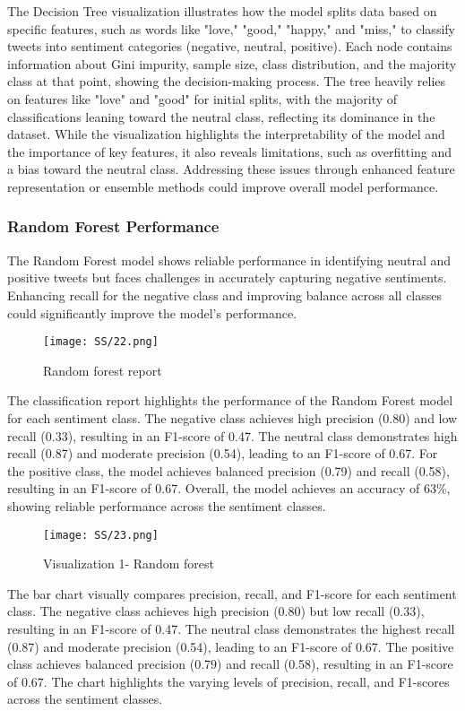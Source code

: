 \documentclass[journal]{IEEEtran}
\begin{document}
The Decision Tree visualization illustrates how the model splits data based on specific features, such as words like "love," "good," "happy," and "miss," to classify tweets into sentiment categories (negative, neutral, positive). Each node contains information about Gini impurity, sample size, class distribution, and the majority class at that point, showing the decision-making process. The tree heavily relies on features like "love" and "good" for initial splits, with the majority of classifications leaning toward the neutral class, reflecting its dominance in the dataset. While the visualization highlights the interpretability of the model and the importance of key features, it also reveals limitations, such as overfitting and a bias toward the neutral class. Addressing these issues through enhanced feature representation or ensemble methods could improve overall model performance.
\subsubsection*{\textbf{Random Forest Performance}}
The Random Forest model shows reliable performance in identifying neutral and positive tweets but faces challenges in accurately capturing negative sentiments. Enhancing recall for the negative class and improving balance across all classes could significantly improve the model's performance. 
\begin{figure}[H]
\centering
\texttt{[image: SS/22.png]}
\caption{Random forest report}
\end{figure}
The classification report highlights the performance of the Random Forest model for each sentiment class. The negative class achieves high precision (0.80) and low recall (0.33), resulting in an F1-score of 0.47. The neutral class demonstrates high recall (0.87) and moderate precision (0.54), leading to an F1-score of 0.67. For the positive class, the model achieves balanced precision (0.79) and recall (0.58), resulting in an F1-score of 0.67. Overall, the model achieves an accuracy of 63\%, showing reliable performance across the sentiment classes.
\begin{figure}[H]
\centering
\texttt{[image: SS/23.png]}
\caption{Visualization 1- Random forest}
\end{figure}
The bar chart visually compares precision, recall, and F1-score for each sentiment class. The negative class achieves high precision (0.80) but low recall (0.33), resulting in an F1-score of 0.47. The neutral class demonstrates the highest recall (0.87) and moderate precision (0.54), leading to an F1-score of 0.67. The positive class achieves balanced precision (0.79) and recall (0.58), resulting in an F1-score of 0.67. The chart highlights the varying levels of precision, recall, and F1-scores across the sentiment classes.
\end{document}
